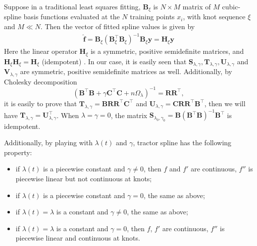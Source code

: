 Suppose in a traditional least squares fitting, $\mathbf{B}_\xi$ is $N \times M$ matrix of $M$ cubic-spline basis functions evaluated at the $N$ training points $x_i$, with knot sequence $\xi$ and $M \ll N$. Then the vector of fitted spline values is given by
\begin{align}\label{fhy}
\hat{\mathbf{f}}=\mathbf{B}_\xi(\mathbf{B}^\top_\xi\mathbf{B}_\xi)^{-1}\mathbf{B}_\xi\mathbf{y}=\mathbf{H}_\xi\mathbf{y}
\end{align}
Here the linear operator $\mathbf{H}_\xi$ is a symmetric, positive semidefinite matrices, and $\mathbf{H}_\xi\mathbf{H}_\xi=\mathbf{H}_\xi$ (idempotent) \cite{esl2009}. In our case, it is easily seen that $\mathbf{S}_{\lambda,\gamma}, \mathbf{T}_{\lambda,\gamma}, \mathbf{U}_{\lambda,\gamma}$ and $\mathbf{V}_{\lambda,\gamma}$ are symmetric, positive semidefinite matrices as well. Additionally, by Cholesky decomposition
\begin{equation}
(\mathbf{B}^\top\mathbf{B}+\gamma\mathbf{C}^\top\mathbf{C}+n\Omega_{\lambda})^{-1}=\mathbf{R}\mathbf{R}^\top,
\end{equation}
it is easily to prove that $\mathbf{T}_{\lambda,\gamma}=\mathbf{B}\mathbf{R}\mathbf{R}^\top\mathbf{C}^\top$ and $\mathbf{U}_{\lambda,\gamma}=\mathbf{C}\mathbf{R}\mathbf{R}^\top\mathbf{B}^\top$, then we will have 
 $\mathbf{T}_{\lambda,\gamma}= \mathbf{U}_{\lambda,\gamma}^\top$. When $\lambda=\gamma=0$, the matrix $\mathbf{S}_{\lambda_0,\gamma_0}=\mathbf{B}(\mathbf{B}^\top\mathbf{B})^{-1}\mathbf{B}^\top$ is idempotent.  

Additionally, by playing with $\lambda(t)$ and $\gamma$, tractor spline has the following property:
\begin{itemize}
\item if $\lambda(t)$ is a piecewise constant and $\gamma \neq 0$, then $f$ and $f'$ are continuous, $f''$ is piecewise linear but not continuous at knots;
\item if $\lambda(t)$ is a piecewise constant and $\gamma = 0$, the same as above;
\item if $\lambda(t)=\lambda $ is a constant and $\gamma \neq 0$, the same as above;
\item if $\lambda(t)=\lambda $ is a constant and $\gamma = 0$, then $f$, $f'$ are continuous, $f''$ is piecewise linear and continuous at knots.
\end{itemize}

